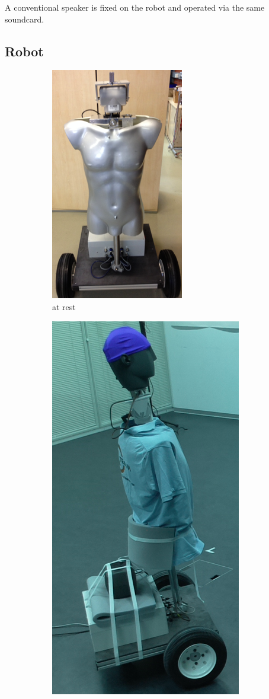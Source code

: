 A conventional speaker is fixed on the robot and operated via the same soundcard. 

\subsection{Robot}

\begin{figure}[H]
    \centering
    \begin{subfigure}{0.3\linewidth}
        \centering
        \includegraphics[height=0.3\textheight]{files/Robot.png}
        \caption{at rest}
    \end{subfigure}
    \begin{subfigure}{0.3\linewidth}
        \centering
        \includegraphics[height=0.3\textheight]{files/Robot2.png}

\end{subfigure}
\end{figure}
